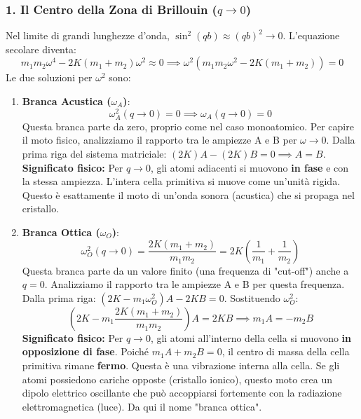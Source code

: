 \subsubsection{1. Il Centro della Zona di Brillouin (\(q \to 0\))}
Nel limite di grandi lunghezze d'onda, \(\sin^2(qb) \approx (qb)^2 \to 0\). L'equazione secolare diventa:
\[ m_1m_2\omega^4 - 2K(m_1+m_2)\omega^2 \approx 0 \implies \omega^2(m_1m_2\omega^2 - 2K(m_1+m_2)) = 0 \]
Le due soluzioni per \(\omega^2\) sono:
\begin{enumerate}
    \item \textbf{Branca Acustica (\(\omega_A\))}:
    \[ \omega^2_A(q \to 0) = 0 \implies \omega_A(q \to 0) = 0 \]
    Questa branca parte da zero, proprio come nel caso monoatomico. Per capire il moto fisico, analizziamo il rapporto tra le ampiezze A e B per \(\omega \to 0\). Dalla prima riga del sistema matriciale: \((2K)A - (2K)B = 0 \implies A=B\).
    \textbf{Significato fisico:} Per \(q \to 0\), gli atomi adiacenti si muovono \textbf{in fase} e con la stessa ampiezza. L'intera cella primitiva si muove come un'unità rigida. Questo è esattamente il moto di un'onda sonora (acustica) che si propaga nel cristallo.
    
    \item \textbf{Branca Ottica (\(\omega_O\))}:
    \[ \omega^2_O(q \to 0) = \frac{2K(m_1+m_2)}{m_1m_2} = 2K\left(\frac{1}{m_1} + \frac{1}{m_2}\right) \]
    Questa branca parte da un valore finito (una frequenza di "cut-off") anche a \(q=0\). Analizziamo il rapporto tra le ampiezze A e B per questa frequenza. Dalla prima riga: \((2K - m_1\omega_O^2)A - 2KB = 0\). Sostituendo \(\omega_O^2\):
    \[ \left(2K - m_1 \frac{2K(m_1+m_2)}{m_1m_2}\right)A = 2KB \implies m_1 A = -m_2 B \]
    \textbf{Significato fisico:} Per \(q \to 0\), gli atomi all'interno della cella si muovono \textbf{in opposizione di fase}. Poiché \(m_1 A + m_2 B = 0\), il centro di massa della cella primitiva rimane \textbf{fermo}. Questa è una vibrazione interna alla cella. Se gli atomi possiedono cariche opposte (cristallo ionico), questo moto crea un dipolo elettrico oscillante che può accoppiarsi fortemente con la radiazione elettromagnetica (luce). Da qui il nome "branca ottica".
\end{enumerate}

